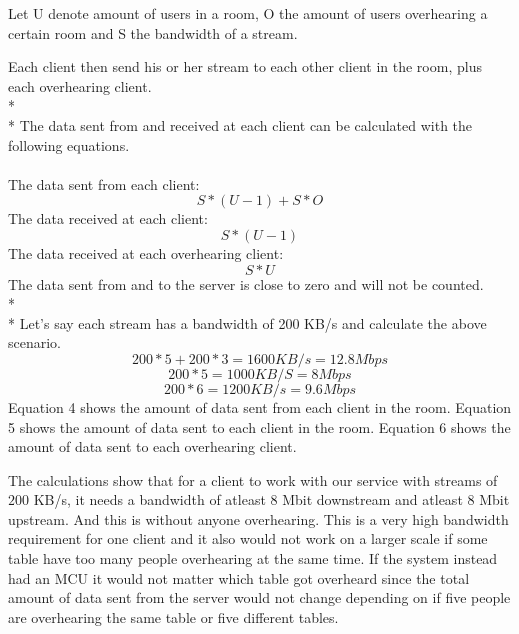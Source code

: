 \documentclass[12pt, titlepage]{article}
\begin{document}
Let U denote amount of users in a room, O the amount of users overhearing a certain room and S the bandwidth of a stream. 

Each client then send his or her stream to each other client in the room, plus each overhearing client.
\\*
\\*
The data sent from and received at each client can be calculated with the following equations.\\\\
The data sent from each client:
\begin{equation}
S*(U-1)+S*O
\end{equation}
The data received at each client: 
\begin{equation}
S*(U-1)
\end{equation}
The data received at each overhearing client:
\begin{equation}
S*U
\end{equation}
The data sent from and to the server is close to zero and will not be counted.
\\*\\*
Let's say each stream has a bandwidth of 200 KB/s and calculate the above scenario.
\begin{equation}
200*5 + 200*3 = 1600 KB/s = 12.8 Mbps
\end{equation}
\begin{equation}
200*5 = 1000 KB/S  = 8 Mbps
\end{equation}
\begin{equation}
200*6 = 1200 KB/s = 9.6 Mbps
\end{equation}
Equation 4 shows the amount of data sent from each client in the room. Equation 5 shows the amount of data sent to each client in the room. Equation 6 shows the amount of data sent to each overhearing client.


The calculations show that for a client to work with our service with streams of $200$ KB/s, it needs a bandwidth of atleast 8 Mbit downstream and atleast 8 Mbit upstream. And this is without anyone overhearing. This is a very high bandwidth requirement for one client and it also would not work on a larger scale if some table have too many people overhearing at the same time. If the system instead had an MCU it would not matter which table got overheard since the total amount of data sent from the server would not change depending on if five people are overhearing the same table or five different tables.
\end{document}
